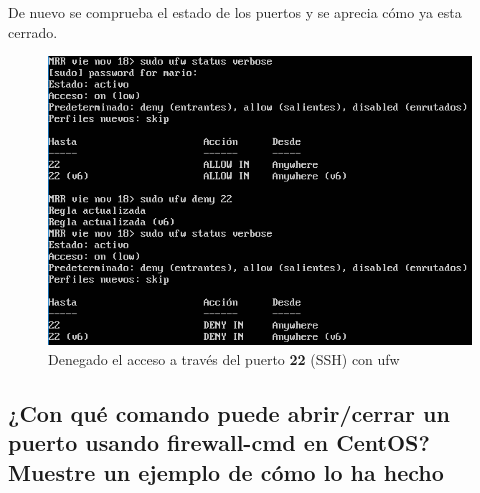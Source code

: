 \begin{itemize}
	
	De nuevo se comprueba el estado de los puertos y se aprecia cómo ya esta cerrado.
	\begin{figure}[H] %
		\centering
		\includegraphics[scale=0.8]{figuras/figura10.png} 
		\caption{Denegado el acceso a través del puerto \textbf{22} (SSH) con ufw} 
		\label{fig:figura10}
	\end{figure}				
\end{itemize}

\subsection{¿Con qué comando puede
	abrir/cerrar un puerto usando firewall-cmd en CentOS? Muestre un ejemplo
	de cómo lo ha hecho}

